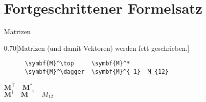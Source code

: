 \section{Fortgeschrittener Formelsatz}

\begin{frame}[fragile]{
  Matrizen
  \hfill
}
  \begin{CodeExample}{0.70}[Matrizen (und damit Vektoren) werden fett geschrieben.]
    \begin{lstlisting}
      \symbf{M}^\top     \symbf{M}^*
      \symbf{M}^\dagger  \symbf{M}^{-1}  M_{12}
    \end{lstlisting}
  \CodeResult
    \strut
    $\symbf{M}^\top    \quad \symbf{M}^*$ \\
    $\symbf{M}^\dagger \quad \symbf{M}^{-1} \quad M_{12}$
  \end{CodeExample}


\end{frame}
